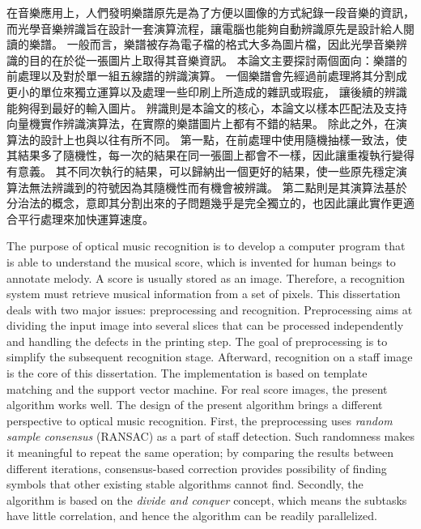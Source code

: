 \begin{abstractzh}
\setcounter{page}{1}
在音樂應用上，人們發明樂譜原先是為了方便以圖像的方式紀錄一段音樂的資訊，
而光學音樂辨識旨在設計一套演算流程，讓電腦也能夠自動辨識原先是設計給人閱讀的樂譜。
一般而言，樂譜被存為電子檔的格式大多為圖片檔，因此光學音樂辨識的目的在於從一張圖片上取得其音樂資訊。
本論文主要探討兩個面向：樂譜的前處理以及對於單一組五線譜的辨識演算。
一個樂譜會先經過前處理將其分割成更小的單位來獨立運算以及處理一些印刷上所造成的雜訊或瑕疵，
讓後續的辨識能夠得到最好的輸入圖片。
辨識則是本論文的核心，本論文以樣本匹配法及支持向量機實作辨識演算法，在實際的樂譜圖片上都有不錯的結果。
除此之外，在演算法的設計上也與以往有所不同。
第一點，在前處理中使用隨機抽樣一致法，使其結果多了隨機性，每一次的結果在同一張圖上都會不一樣，因此讓重複執行變得有意義。
其不同次執行的結果，可以歸納出一個更好的結果，使一些原先穩定演算法無法辨識到的符號因為其隨機性而有機會被辨識。
第二點則是其演算法基於分治法的概念，意即其分割出來的子問題幾乎是完全獨立的，也因此讓此實作更適合平行處理來加快運算速度。
\end{abstractzh}


\begin{abstracten}
\setcounter{page}{2}
The purpose of optical music recognition is to develop a computer program that is able to understand the musical score, which is invented for human beings to annotate melody. A score is usually stored as an image. Therefore, a recognition system must retrieve musical information from a set of pixels.
This dissertation deals with two major issues: preprocessing and recognition. Preprocessing aims at dividing the input image into several slices that can be processed independently and handling the defects in the printing step. The goal of preprocessing is to simplify the subsequent recognition stage. Afterward, recognition on a staff image is the core of this dissertation. The implementation is based on template matching and the support vector machine. For real score images, the present algorithm works well.
The design of the present algorithm brings a different perspective to optical music recognition. First, the preprocessing uses \emph{random sample consensus} (RANSAC) as a part of staff detection. Such randomness makes it meaningful to repeat the same operation; by comparing the results between different iterations, consensus-based correction provides possibility of finding symbols that other existing stable algorithms cannot find. Secondly, the algorithm is based on the \emph{divide and conquer} concept, which means the subtasks have little correlation, and hence the algorithm can be readily parallelized.
\end{abstracten}



